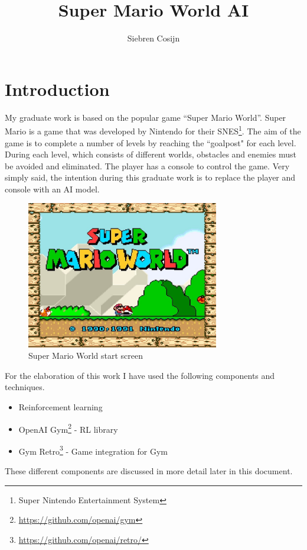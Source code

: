 \documentclass{article}
\title{Super Mario World AI}
\author{Siebren Cosijn}
\date{\displaydate{date}}
\begin{document}
\maketitle

\section{Introduction}
My graduate work is based on the popular game ``Super Mario World''.
Super Mario is a game that was developed by Nintendo for their SNES\footnote{Super Nintendo Entertainment System}.
The aim of the game is to complete a number of levels by reaching the “goalpost" for each level.
During each level, which consists of different worlds, obstacles and enemies must be avoided and eliminated.
The player has a console to control the game.
Very simply said, the intention during this graduate work is to replace the player and console with an AI model.

\begin{figure}[ht]
    \centering
    \includegraphics[width=0.75\textwidth]{start-screen}
    \caption{Super Mario World start screen}
    \label{fig:smw}
\end{figure}

For the elaboration of this work I have used the following components and techniques.
\begin{itemize}
    \item Reinforcement learning
    \item OpenAI Gym\footnote{\url{https://github.com/openai/gym}} \cite{brockman2016openai} - RL library
    \item Gym Retro\footnote{\url{https://github.com/openai/retro/}} - Game integration for Gym
\end{itemize}
These different components are discussed in more detail later in this document.
\end{document}
